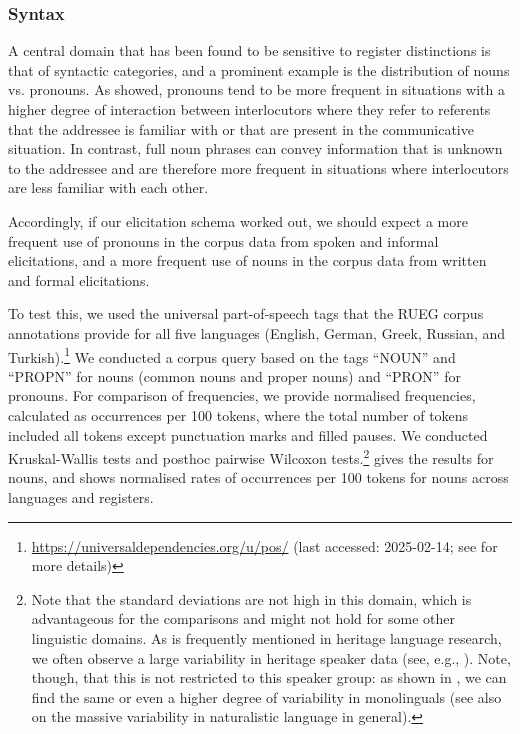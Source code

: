 \documentclass[output=paper,colorlinks,citecolor=brown]{langscibook}
\begin{document}
\subsubsection{Syntax} \label{ch1:sec:3.1.1}
A central domain that has been found to be sensitive to register distinctions is that of syntactic categories, and a prominent example is the distribution of nouns vs. pronouns. As \citet[Chapter~3]{biberconrad2019} showed, pronouns tend to be more frequent in situations with a higher degree of interaction between interlocutors where they refer to referents that the addressee is familiar with or that are present in the communicative situation. In contrast, full noun phrases can convey information that is unknown to the addressee and are therefore more frequent in situations where interlocutors are less familiar with each other.

Accordingly, if our elicitation schema worked out, we should expect a more frequent use of pronouns in the corpus data from spoken and informal elicitations, and a more frequent use of nouns in the corpus data from written and formal elicitations.

To test this, we used the universal part-of-speech tags that the RUEG corpus annotations provide for all five languages (English, German, Greek, Russian, and Turkish).\footnote{\url{https://universaldependencies.org/u/pos/} (last accessed: 2025-02-14; see  for more details)}  We conducted a corpus query based on the tags “NOUN” and “PROPN” for nouns (common nouns and proper nouns) and “PRON” for pronouns. For comparison of frequencies, we provide normalised frequencies, calculated as occurrences per 100 tokens, where the total number of tokens included all tokens except punctuation marks and filled pauses. We conducted Kruskal-Wallis tests and posthoc pairwise Wilcoxon tests.\footnote{Note that the standard deviations are not high in this domain, which is advantageous for the comparisons and might not hold for some other linguistic domains. As is frequently mentioned in heritage language research, we often observe a large variability in heritage speaker data (see, e.g., \cite{montrul2015,polinsky2018}). Note, though, that this is not restricted to this speaker group: as shown in \citet{wieseetal2022}, we can find the same or even a higher degree of variability in monolinguals (see also  on the massive variability in naturalistic language in general).}  gives the results for nouns, and  shows normalised rates of occurrences per 100 tokens for nouns across languages and registers.
\end{document}
